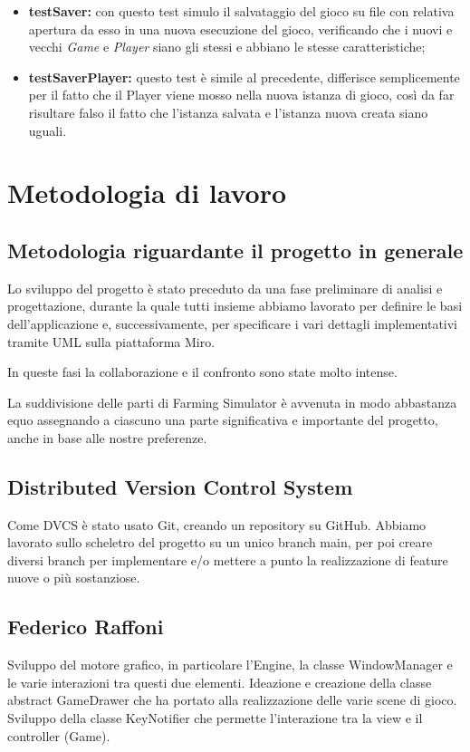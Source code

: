 \documentclass[a4paper,12pt]{report}
\begin{document}
{\begin{itemize}
	\item \textbf{testSaver:} con questo test simulo il salvataggio del gioco su file con relativa apertura da esso in una nuova esecuzione del gioco, verificando che i nuovi e vecchi \textit{Game} e \textit{Player} siano gli stessi e abbiano le stesse caratteristiche;
	\item \textbf{testSaverPlayer:} questo test è simile al precedente, differisce semplicemente per il fatto che il Player viene mosso nella nuova istanza di gioco, così da far risultare falso il fatto che l'istanza salvata e l'istanza nuova creata siano uguali.
\end{itemize}
}



\section{Metodologia di lavoro}

\subsection*{Metodologia riguardante il progetto in generale}
Lo sviluppo del progetto è stato preceduto da una fase preliminare di analisi e progettazione, durante la quale tutti insieme abbiamo lavorato per definire le basi dell'applicazione e, successivamente, per specificare i vari dettagli implementativi tramite UML sulla piattaforma Miro.

In queste fasi la collaborazione e il confronto sono state molto intense.

La suddivisione delle parti di Farming Simulator  è avvenuta in modo abbastanza equo assegnando a ciascuno una parte significativa e importante del progetto, anche in base alle nostre preferenze. 


\subsection*{Distributed Version Control System}
Come DVCS è stato usato Git, creando un repository su GitHub. Abbiamo lavorato sullo scheletro del progetto su un unico branch main, per poi creare diversi branch per implementare e/o mettere a punto la realizzazione di feature nuove o più sostanziose.

\subsection{Federico Raffoni}
Sviluppo del motore grafico, in particolare l’Engine, la classe WindowManager e le varie interazioni tra questi due elementi. Ideazione e creazione della classe abstract GameDrawer che ha portato alla realizzazione delle varie scene di gioco.  Sviluppo della classe KeyNotifier che permette l’interazione tra la view e il controller (Game).
\end{document}
